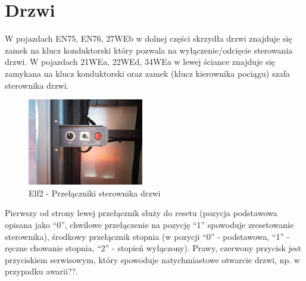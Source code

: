 \section{Drzwi}
W pojazdach EN75, EN76, 27WEb w dolnej części skrzydła drzwi znajduje się zamek na klucz konduktorski który pozwala na wyłączenie/odcięcie sterowania drzwi. W pojazdach 21WEa, 22WEd, 34WEa w lewej ściance znajduje się zamykana na klucz konduktorski oraz zamek (klucz kierownika pociągu) szafa sterownika drzwi.
	\begin{figure}
		\includegraphics[width=0.45\textwidth]{skryptkierownik-img/skryptkierownik-img048.jpg}
		\caption{Elf2 - Przełączniki sterownika drzwi}
	\end{figure}

Pierwszy od strony lewej przełącznik służy do resetu (pozycja podstawowa opisana jako “0”, chwilowe przełączenie na pozycję “1” spowoduje zresetowanie sterownika), środkowy przełącznik stopnia (w pozycji “0” - podstawowa, “1” - ręczne chowanie stopnia, “2” - stopień wyłączony). Prawy, czerwony przycisk jest przyciskiem serwisowym, który spowoduje natychmiastowe otwarcie drzwi, np. w przypadku awarii??.

